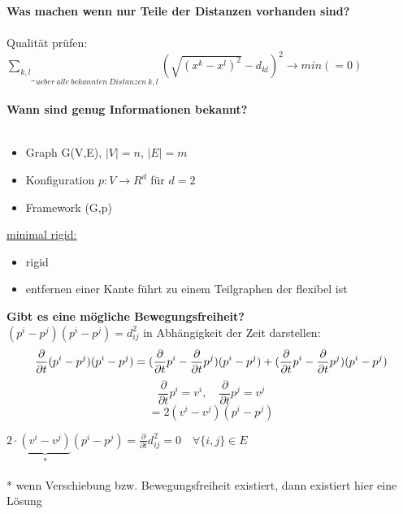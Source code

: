 \documentclass[12pt,a4paper]{article}
\begin{document}
\textbf{Was machen wenn nur Teile der Distanzen vorhanden sind?}\\\\
Qualität prüfen: $\underbrace{\sum \limits_{k,l}}_{ueber\ alle\ bekannten\ Distanzen\ k,l}(\sqrt{(x^k-x^l)^2}-d_{kl})^2 \rightarrow min (=0)$
\\\\
\textbf{Wann sind genug Informationen bekannt?}\\\\
\begin{itemize}
	\item Graph G(V,E), $|V|=n$, $|E|=m$
	\item Konfiguration $p:V\rightarrow R^d$ für $d=2$
	\item Framework (G,p)
\end{itemize}

\newpage
\underline{minimal rigid:}
\begin{itemize}
	\item rigid
	\item entfernen einer Kante führt zu einem Teilgraphen der flexibel ist
\end{itemize}

\textbf{Gibt es eine mögliche Bewegungsfreiheit?}\\
$(p^i-p^j)(p^i-p^j)=d_{ij}^2$ in Abhängigkeit der Zeit darstellen:\\
\begin{equation*}
    \frac{\partial}{\partial t} (p^i-p^j)(p^i-p^j) = (\frac{\partial}{\partial t}p^i - \frac{\partial}{\partial t}p^j)(p^i-p^j) + (\frac{\partial}{\partial t}p^i - \frac{\partial}{\partial t}p^j)(p^i-p^j)\\
\end{equation*}
\begin{equation*}
    \frac{\partial}{\partial t} p^i = v^i, \quad \frac{\partial}{\partial t} p^j = v^j
\end{equation*}
\begin{equation*}
    = 2(v^i-v^j)(p^i-p^j)
\end{equation*}

$2\cdot \underbrace{(v^i-v^j)}_{*}(p^i-p^j)=\frac{\partial}{\partial t}d_{ij}^2=0 \quad \forall \{i,j\} \in E$\\\\
* wenn Verschiebung bzw. Bewegungsfreiheit existiert, dann existiert hier eine Lösung
\end{document}
